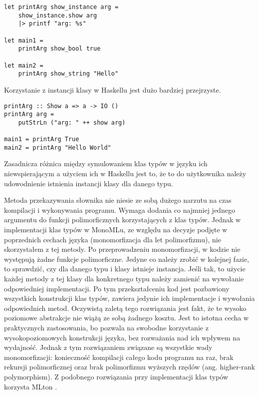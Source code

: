 \documentclass[declaration,shortabstract]{iithesis}
\begin{document}
\begin{lstlisting}[frame=lines]
let printArg show_instance arg = 
    show_instance.show arg
    |> printf "arg: %s" 

let main1 = 
    printArg show_bool true 

let main2 = 
    printArg show_string "Hello"
\end{lstlisting}
Korzystanie z instancji klasy w Haskellu jest dużo bardziej przejrzyste.
\begin{lstlisting}[frame=lines]
printArg :: Show a => a -> IO ()
printArg arg = 
    putStrLn ("arg: " ++ show arg)

main1 = printArg True
main2 = printArg "Hello World"
\end{lstlisting}



Zasadnicza różnica między symulowaniem klas typów w języku ich 
niewspierającym a użyciem ich w Haskellu jest to, że to do użytkownika należy 
udowodnienie istnienia instancji klasy dla danego typu.

Metoda przekazywania słownika nie niesie ze sobą dużego narzutu na czas 
kompilacji i wykonywania programu. Wymaga dodania co najmniej
jednego argumentu do funkcji polimorficznych korzystających z klas typów. 
Jednak w implementacji klas typów w MonoMLu, ze względu na decyzje 
podjęte w poprzednich cechach języka (monomorfizacja dla let polimorfizmu), 
nie skorzystałem z tej metody. Po przeprowadzeniu monomorfizacji, w kodzie nie 
występują żadne funkcje polimorficzne. Jedyne co należy zrobić w kolejnej 
fazie, to sprawdzić, czy dla danego typu i klasy istnieje instancja. Jeśli tak,
to użycie każdej metody z tej klasy dla konkretnego typu należy zamienić 
na wywołanie odpowiedniej implementacji. Po tym przekształceniu kod jest 
pozbawiony wszystkich konstrukcji klas typów, zawiera jedynie ich 
implementacje i wywołania odpowiednich metod. Oczywistą zaletą tego rozwiązania
jest fakt, że te wysoko poziomowe abstrakcje nie wiążą ze sobą żadnego kosztu.
Jest to istotna cecha w praktycznych zastosowania, bo pozwala na swobodne 
korzystanie z wysokopoziomowych konstrukcji języka, bez rozważania nad ich 
wpływem na wydajność. Jednak z tym rozwiązaniem związane są wszystkie wady 
monomorfizacji: konieczność kompilacji całego kodu 
programu na raz, 
brak rekursji polimorficznej oraz brak polimorfizmu wyższych 
rzędów (ang. higher-rank polymorphism).
Z podobnego rozwiązania przy implementacji klas typów 
korzysta MLton \cite{okmij}.
\end{document}
